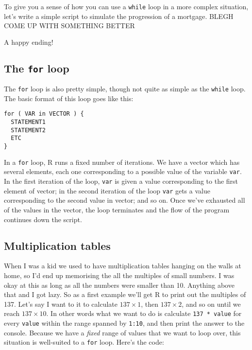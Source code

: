 \documentclass[]{book}
\begin{document}
To give you a sense of how you can use a \texttt{while} loop in a more complex situation, let's write a simple script to simulate the progression of a mortgage. BLEGH COME UP WITH SOMETHING BETTER

A happy ending! 🎉 🎈 🍰

\hypertarget{the-for-loop}{%
\subsection{\texorpdfstring{The \texttt{for} loop}{The for loop}}\label{the-for-loop}}

The \texttt{for} loop is also pretty simple, though not quite as simple as the \texttt{while} loop. The basic format of this loop goes like this:

\begin{verbatim}
for ( VAR in VECTOR ) {
  STATEMENT1
  STATEMENT2
  ETC 
}
\end{verbatim}

In a \texttt{for} loop, R runs a fixed number of iterations. We have a vector which has several elements, each one corresponding to a possible value of the variable \texttt{var}. In the first iteration of the loop, \texttt{var} is given a value corresponding to the first element of vector; in the second iteration of the loop \texttt{var} gets a value corresponding to the second value in vector; and so on. Once we've exhausted all of the values in the vector, the loop terminates and the flow of the program continues down the script.

\hypertarget{multiplication-tables}{%
\subsection{Multiplication tables}\label{multiplication-tables}}

When I was a kid we used to have multiplication tables hanging on the walls at home, so I'd end up memorising the all the multiples of small numbers. I was okay at this as long as all the numbers were smaller than 10. Anything above that and I got lazy. So as a first example we'll get R to print out the multiples of 137. Let's say I want to it to calculate \(137 \times 1\), then \(137 \times 2\), and so on until we reach \(137 \times 10\). In other words what we want to do is calculate \texttt{137\ *\ value} for every \texttt{value} within the range spanned by \texttt{1:10}, and then print the answer to the console. Because we have a \emph{fixed} range of values that we want to loop over, this situation is well-suited to a \texttt{for} loop. Here's the code:
\end{document}

